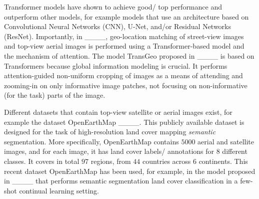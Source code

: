 Transformer
models have shown to achieve good/ top performance and outperform other 
models, for example models that use an architecture based on Convolutional Neural Networks (CNN), U-Net, and/or Residual Networks (ResNet).            
Importantly, in ____, geo-location matching of street-view images and top-view aerial images is performed using a Transformer-based model and the mechanism of attention. 
The model TransGeo proposed in ____ is based on Transformers because global information modeling is crucial.    
It performs attention-guided non-uniform cropping of images as a means of attending and zooming-in on only informative image patches, not focusing on non-informative (for the task) parts of the image.    








\iffalse   
Recent \textit{Transformer}-based vision models are powerful and effective, achieving very good performance ____.      
For example, the model proposed in ____ is for semantic segmentation of unlabelled data, i.e. top-view aerial images, using domain adaptation techniques, and is based on the architecture SegFormer ____.  
The results of the model presented in ____ have been used for cross-view geo-location matching of street-view images and top-view aerial images in ____.  
The accurate matching of street- and top-view images in general is challenging ____. 
In this work, the new multi-modal street-view and EO dataset MyCD contains co-localized images of street-view, top-view satellite VHR, and satellite Sentinel-2 $10$m resolution, and the main aim is to accurately predict the age of buildings in cities in Europe for energy efficiency and sustainability purposes.  
For this important difficult task of automatically estimating the construction year of buildings, even in cities that are not included in the training data (i.e. previously unseen cities), as well as even when inference/ testing is performed using only the top-view modalities without the street-view image, the use of Transformer-based models is critical.
\fi

Different datasets that contain top-view satellite or aerial images exist, for example the dataset OpenEarthMap ____.      
This publicly available dataset is %
designed for the task of high-resolution land cover mapping \textit{semantic} segmentation.       
More specifically, OpenEarthMap contains $5000$ aerial and satellite images, and for each image, it has land cover labels/ annotations for $8$ different classes.   
It covers in total $97$ regions, from $44$ countries across $6$ continents.    
This recent dataset OpenEarthMap has been used, for example, in the model proposed in ____ that performs semantic segmentation land cover classification in a few-shot continual learning setting.
\fi